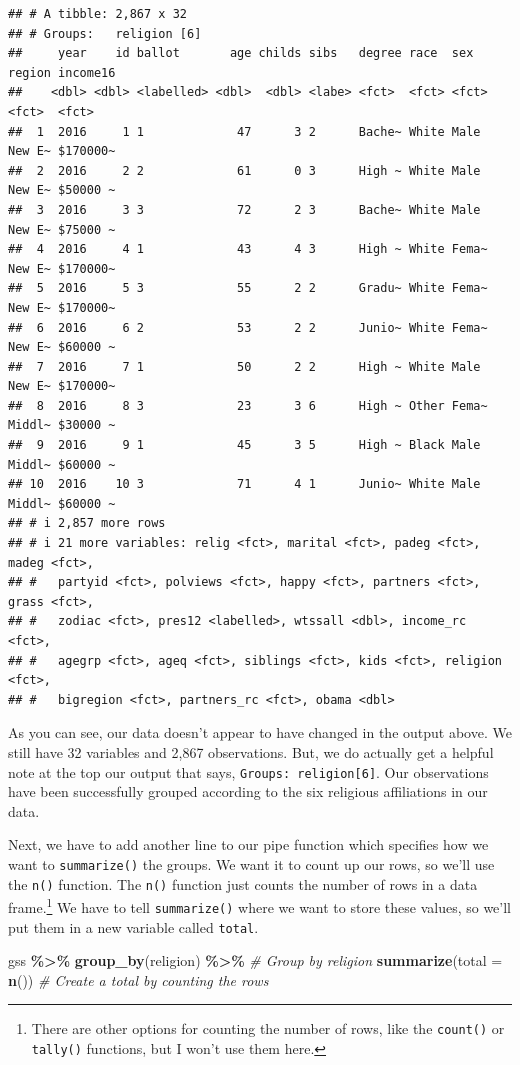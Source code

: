 \documentclass[
]{book}
\newenvironment{Shaded}{\begin{snugshade}}{\end{snugshade}}
\newcommand{\AttributeTok}[1]{\textcolor[rgb]{0.13,0.29,0.53}{#1}}
\newcommand{\CommentTok}[1]{\textcolor[rgb]{0.56,0.35,0.01}{\textit{#1}}}
\newcommand{\FunctionTok}[1]{\textcolor[rgb]{0.13,0.29,0.53}{\textbf{#1}}}
\newcommand{\NormalTok}[1]{#1}
\newcommand{\SpecialCharTok}[1]{\textcolor[rgb]{0.81,0.36,0.00}{\textbf{#1}}}
\begin{document}
\begin{verbatim}
## # A tibble: 2,867 x 32
## # Groups:   religion [6]
##     year    id ballot       age childs sibs   degree race  sex   region income16
##    <dbl> <dbl> <labelled> <dbl>  <dbl> <labe> <fct>  <fct> <fct> <fct>  <fct>   
##  1  2016     1 1             47      3 2      Bache~ White Male  New E~ $170000~
##  2  2016     2 2             61      0 3      High ~ White Male  New E~ $50000 ~
##  3  2016     3 3             72      2 3      Bache~ White Male  New E~ $75000 ~
##  4  2016     4 1             43      4 3      High ~ White Fema~ New E~ $170000~
##  5  2016     5 3             55      2 2      Gradu~ White Fema~ New E~ $170000~
##  6  2016     6 2             53      2 2      Junio~ White Fema~ New E~ $60000 ~
##  7  2016     7 1             50      2 2      High ~ White Male  New E~ $170000~
##  8  2016     8 3             23      3 6      High ~ Other Fema~ Middl~ $30000 ~
##  9  2016     9 1             45      3 5      High ~ Black Male  Middl~ $60000 ~
## 10  2016    10 3             71      4 1      Junio~ White Male  Middl~ $60000 ~
## # i 2,857 more rows
## # i 21 more variables: relig <fct>, marital <fct>, padeg <fct>, madeg <fct>,
## #   partyid <fct>, polviews <fct>, happy <fct>, partners <fct>, grass <fct>,
## #   zodiac <fct>, pres12 <labelled>, wtssall <dbl>, income_rc <fct>,
## #   agegrp <fct>, ageq <fct>, siblings <fct>, kids <fct>, religion <fct>,
## #   bigregion <fct>, partners_rc <fct>, obama <dbl>
\end{verbatim}

As you can see, our data doesn't appear to have changed in the output above. We still have 32 variables and 2,867 observations. But, we do actually get a helpful note at the top our output that says, \texttt{Groups:\ religion{[}6{]}}. Our observations have been successfully grouped according to the six religious affiliations in our data.

Next, we have to add another line to our pipe function which specifies how we want to \texttt{summarize()} the groups. We want it to count up our rows, so we'll use the \texttt{n()} function. The \texttt{n()} function just counts the number of rows in a data frame.\footnote{There are other options for counting the number of rows, like the \texttt{count()} or \texttt{tally()} functions, but I won't use them here.} We have to tell \texttt{summarize()} where we want to store these values, so we'll put them in a new variable called \texttt{total}.

\begin{Shaded}
\begin{Highlighting}[]
\NormalTok{gss }\SpecialCharTok{\%\textgreater{}\%}
  \FunctionTok{group\_by}\NormalTok{(religion) }\SpecialCharTok{\%\textgreater{}\%}      \CommentTok{\# Group by religion}
  \FunctionTok{summarize}\NormalTok{(}\AttributeTok{total =} \FunctionTok{n}\NormalTok{())      }\CommentTok{\# Create a total by counting the rows}
\end{Highlighting}
\end{Shaded}
\end{document}
